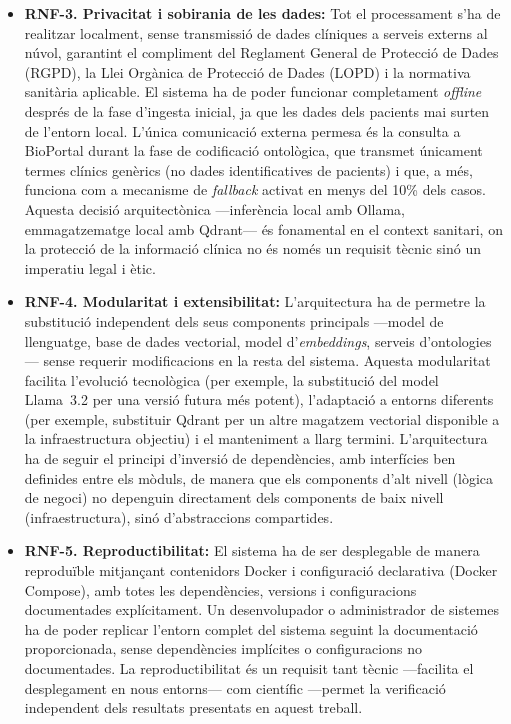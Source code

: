 \documentclass[CAT]{TFUOC}%
\begin{document}
\begin{itemize}
    \item \textbf{RNF-3. Privacitat i sobirania de les dades:} Tot el processament s'ha de realitzar localment, sense transmissió de dades clíniques a serveis externs al núvol, garantint el compliment del Reglament General de Protecció de Dades (RGPD), la Llei Orgànica de Protecció de Dades (LOPD) i la normativa sanitària aplicable. El sistema ha de poder funcionar completament \textit{offline} després de la fase d'ingesta inicial, ja que les dades dels pacients mai surten de l'entorn local. L'única comunicació externa permesa és la consulta a BioPortal durant la fase de codificació ontològica, que transmet únicament termes clínics genèrics (no dades identificatives de pacients) i que, a més, funciona com a mecanisme de \textit{fallback} activat en menys del 10\% dels casos. Aquesta decisió arquitectònica ---inferència local amb Ollama, emmagatzematge local amb Qdrant--- és fonamental en el context sanitari, on la protecció de la informació clínica no és només un requisit tècnic sinó un imperatiu legal i ètic.

    \item \textbf{RNF-4. Modularitat i extensibilitat:} L'arquitectura ha de permetre la substitució independent dels seus components principals ---model de llenguatge, base de dades vectorial, model d'\textit{embeddings}, serveis d'ontologies--- sense requerir modificacions en la resta del sistema. Aquesta modularitat facilita l'evolució tecnològica (per exemple, la substitució del model Llama~3.2 per una versió futura més potent), l'adaptació a entorns diferents (per exemple, substituir Qdrant per un altre magatzem vectorial disponible a la infraestructura objectiu) i el manteniment a llarg termini. L'arquitectura ha de seguir el principi d'inversió de dependències, amb interfícies ben definides entre els mòduls, de manera que els components d'alt nivell (lògica de negoci) no depenguin directament dels components de baix nivell (infraestructura), sinó d'abstraccions compartides.

    \item \textbf{RNF-5. Reproductibilitat:} El sistema ha de ser desplegable de manera reproduïble mitjançant contenidors Docker i configuració declarativa (Docker Compose), amb totes les dependències, versions i configuracions documentades explícitament. Un desenvolupador o administrador de sistemes ha de poder replicar l'entorn complet del sistema seguint la documentació proporcionada, sense dependències implícites o configuracions no documentades. La reproductibilitat és un requisit tant tècnic ---facilita el desplegament en nous entorns--- com científic ---permet la verificació independent dels resultats presentats en aquest treball.


\end{itemize}
\end{document}
